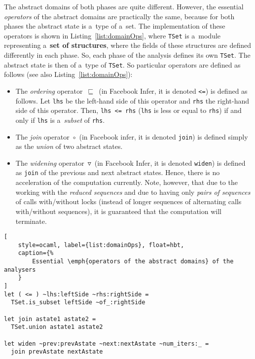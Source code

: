\newpage
The abstract domains of both phases are quite different. However,
the essential \emph{operators} of the abstract domains are practically the
same, because for both phases the abstract state is a~type of a~set. The
implementation of these operators is shown in
Listing~\ref{list:domainOps}, where \texttt{TSet} is a~module representing
a~\textbf{set of structures}, where the fields of these structures are
defined differently in each phase. So, each phase of the analysis defines its
own \texttt{TSet}. The abstract state is then of a~type of \texttt{TSet}.
So particular operators are defined as follows (see also
Listing~\ref{list:domainOps}):
\begin{itemize}
    \item
        The \emph{ordering} operator~$ \sqsubseteq $~(in Facebook Infer,
        it is denoted \texttt{<=}) is defined as follows. Let \texttt{lhs} be
        the left-hand side of this operator and \texttt{rhs} the right-hand
        side of this operator. Then, \texttt{lhs~<=~rhs} (\texttt{lhs} is
        less or equal to \texttt{rhs}) if and only if
        \texttt{lhs} is a~\emph{subset} of \texttt{rhs}.

    \item
        The \emph{join} operator~$ \circ $~(in Facebook infer, it is 
        denoted \texttt{join}) is defined simply as the \emph{union} of 
        two abstract states.

    \item
        The \emph{widening} operator~$ \triangledown $~(in Facebook Infer,
        it is denoted \texttt{widen}) is defined as \texttt{join} of the
        previous and next abstract states. Hence, there is no acceleration 
        of the computation currently. Note, however, that due to the 
        working with the \emph{reduced sequences} and due to having only 
        \emph{pairs of sequences} of calls with/without locks (instead of 
        longer sequences of alternating calls with/without sequences), it 
        is guaranteed that the computation will terminate.
\end{itemize}

\begin{lstlisting}[
    style=ocaml, label={list:domainOps}, float=hbt,
    caption={%
        Essential \emph{operators of the abstract domains} of the analysers
    }
]
let ( <= ) ~lhs:leftSide ~rhs:rightSide =
  TSet.is_subset leftSide ~of_:rightSide

let join astate1 astate2 =
  TSet.union astate1 astate2

let widen ~prev:prevAstate ~next:nextAstate ~num_iters:_ =
  join prevAstate nextAstate
\end{lstlisting}


